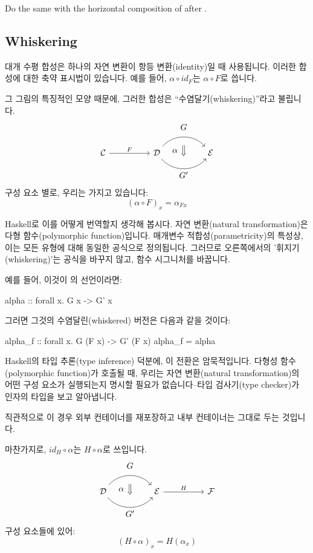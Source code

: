 \documentclass[DaoFP]{subfiles}
\begin{document}
\begin{exercise}
Do the same with the horizontal composition of  after . 
\end{exercise}

\subsection{Whiskering}

대개 수평 합성은 하나의 자연 변환이 항등 변환(identity)일 때 사용됩니다. 이러한 합성에 대한 축약 표시법이 있습니다. 예를 들어, $\alpha \circ id_F$는 $\alpha \circ F$로 씁니다.

그 그림의 특징적인 모양 때문에, 그러한 합성은 ``수염달기(whiskering)''라고 불립니다.
\[
\begin{tikzcd}[column sep=huge]
\mathcal{C}
 \arrow[r, "F"]
 &
\mathcal{D}
  \arrow[bend left=50]{r}[name=U1, label=above:$G$]{}
  \arrow[bend right=50]{r}[name=D1, label=below:$G'$]{} 
 &
\mathcal{E}
  \arrow[shorten <=10pt,shorten >=10pt,Rightarrow,to path={(U1) -- node[label=left:$\alpha$] {} (D1)}]{}
\end{tikzcd}
\]
구성 요소 별로, 우리는 가지고 있습니다:
\[ (\alpha \circ F)_x = \alpha_{F x} \]

Haskell로 이를 어떻게 번역할지 생각해 봅시다. 자연 변환(natural transformation)은 다형 함수(polymorphic function)입니다. 매개변수 적합성(parametricity)의 특성상, 이는 모든 유형에 대해 동일한 공식으로 정의됩니다. 그러므로 오른쪽에서의 '휘지기(whiskering)'는 공식을 바꾸지 않고, 함수 시그니처를 바꿉니다.

예를 들어, 이것이 의 선언이라면:
\begin{haskell}
alpha :: forall x. G x -> G' x
\end{haskell}
그러면 그것의 수염달린(whiskered) 버전은 다음과 같을 것이다:
\begin{haskell}
alpha_f :: forall x. G (F x) -> G' (F x)
alpha_f = alpha
\end{haskell}
Haskell의 타입 추론(type inference) 덕분에, 이 전환은 암묵적입니다. 다형성 함수(polymorphic function)가 호출될 때, 우리는 자연 변환(natural transformation)의 어떤 구성 요소가 실행되는지 명시할 필요가 없습니다--타입 검사기(type checker)가 인자의 타입을 보고 알아냅니다.

직관적으로 이 경우 외부 컨테이너를 재포장하고 내부 컨테이너는 그대로 두는 것입니다.

마찬가지로, $id_H \circ \alpha$는 $H \circ \alpha$로 쓰입니다.
\[
\begin{tikzcd}[column sep=huge]
\mathcal{D}
  \arrow[bend left=50]{r}[name=U, label=above:$G$]{}
  \arrow[bend right=50]{r}[name=D, label=below:$G'$]{} 
 &
\mathcal{E}
\arrow[r, "H"]
&
\mathcal{F}
  \arrow[shorten <=10pt,shorten >=10pt,Rightarrow,to path={(U) -- node[label=left:$\alpha$] {} (D)}]{}
\end{tikzcd}
\]
구성 요소들에 있어:
\[(H \circ \alpha)_x = H (\alpha_x) \]
\end{document}
